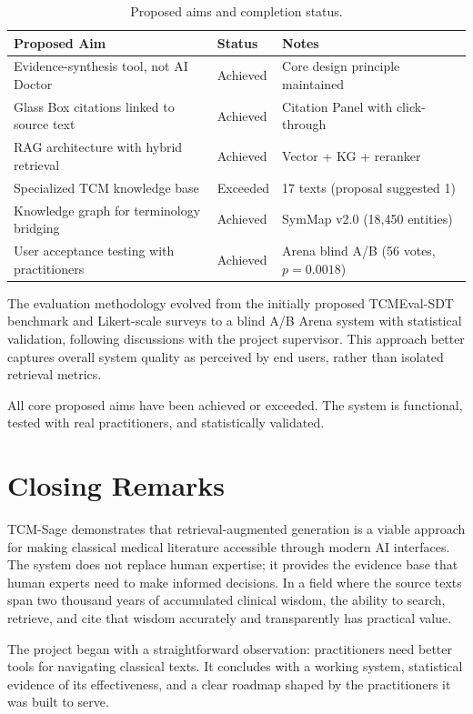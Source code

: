 \begin{table}[H]
\centering
\caption{Proposed aims and completion status.}
\begin{tabularx}{\textwidth}{Xll}
\toprule
\textbf{Proposed Aim} & \textbf{Status} & \textbf{Notes} \\
\midrule
Evidence-synthesis tool, not AI Doctor & Achieved & Core design principle maintained \\
Glass Box citations linked to source text & Achieved & Citation Panel with click-through \\
RAG architecture with hybrid retrieval & Achieved & Vector + KG + reranker \\
Specialized TCM knowledge base & Exceeded & 17 texts (proposal suggested 1) \\
Knowledge graph for terminology bridging & Achieved & SymMap v2.0 (18,450 entities) \\
User acceptance testing with practitioners & Achieved & Arena blind A/B (56 votes, $p=0.0018$) \\
\bottomrule
\end{tabularx}
\end{table}

The evaluation methodology evolved from the initially proposed TCMEval-SDT benchmark and Likert-scale surveys to a blind A/B Arena system with statistical validation, following discussions with the project supervisor. This approach better captures overall system quality as perceived by end users, rather than isolated retrieval metrics.

All core proposed aims have been achieved or exceeded. The system is functional, tested with real practitioners, and statistically validated.

\section{Closing Remarks}

TCM-Sage demonstrates that retrieval-augmented generation is a viable approach for making classical medical literature accessible through modern AI interfaces. The system does not replace human expertise; it provides the evidence base that human experts need to make informed decisions. In a field where the source texts span two thousand years of accumulated clinical wisdom, the ability to search, retrieve, and cite that wisdom accurately and transparently has practical value.

The project began with a straightforward observation: practitioners need better tools for navigating classical texts. It concludes with a working system, statistical evidence of its effectiveness, and a clear roadmap shaped by the practitioners it was built to serve.
